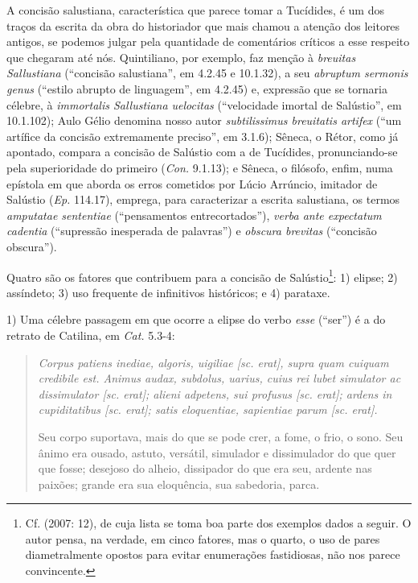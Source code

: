 A concisão salustiana, característica que parece tomar a Tucídides, é um dos
traços da escrita da obra do historiador que mais chamou a atenção dos leitores
antigos, se podemos julgar pela quantidade de comentários críticos a esse
respeito que chegaram até nós. Quintiliano, por exemplo, faz menção à
\emph{breuitas Sallustiana} (“concisão salustiana”, em 4.2.45 e 10.1.32), a  seu \emph{abruptum sermonis genus }(“estilo abrupto de linguagem”, em 4.2.45) e,
expressão que se tornaria célebre, à \emph{immortalis Sallustiana uelocitas}
(“velocidade imortal de Salústio”, em 10.1.102); Aulo Gélio denomina nosso autor
\emph{subtilissimus breuitatis artifex} (“um artífice da concisão extremamente
preciso”, em 3.1.6); Sêneca, o Rétor, como já apontado, compara a concisão de
Salústio com a de Tucídides, pronunciando-se pela superioridade do primeiro
(\emph{Con.} 9.1.13); e Sêneca, o filósofo, enfim, numa epístola em que aborda os erros cometidos por Lúcio Arrúncio,
imitador de Salústio (\emph{Ep.} 114.17), emprega, para caracterizar a escrita salustiana, os termos \emph{amputatae sententiae} (``pensamentos entrecortados''), \emph{verba ante expectatum cadentia} (``supressão inesperada de palavras'') e \emph{obscura brevitas} (``concisão obscura''). 




Quatro são os fatores que contribuem para a concisão de
Salústio\footnote{Cf.  (2007: 12), de cuja lista se toma boa parte dos
exemplos dados a seguir. O autor  pensa, na verdade, em cinco fatores, mas o
quarto, o uso de pares diametralmente opostos para evitar enumerações
fastidiosas, não nos parece convincente.}: 1) elipse; 2) assíndeto; 3) uso
frequente de infinitivos históricos; e 4) parataxe.  


1) Uma célebre passagem em
que ocorre a elipse do verbo \emph{esse} (“ser”) é a do retrato de Catilina, em \emph{Cat.} 
5.3-4: \begin{quote} \emph{Corpus patiens inediae, algoris, uigiliae [sc. erat],
  supra quam cuiquam credibile est. Animus audax, subdolus, uarius, cuius rei
lubet simulator ac dissimulator [sc. erat]; alieni adpetens, sui profusus [sc.
erat]; ardens in cupiditatibus [sc. erat]; satis eloquentiae, sapientiae parum
[sc. erat].}

Seu corpo suportava, mais do que se pode crer, a fome, o frio, o sono. Seu
ânimo era ousado, astuto, versátil, simulador e dissimulador do que quer que
fosse; desejoso do alheio, dissipador do que era seu, ardente nas paixões;
grande era sua eloquência, sua sabedoria, parca.  \end{quote}

